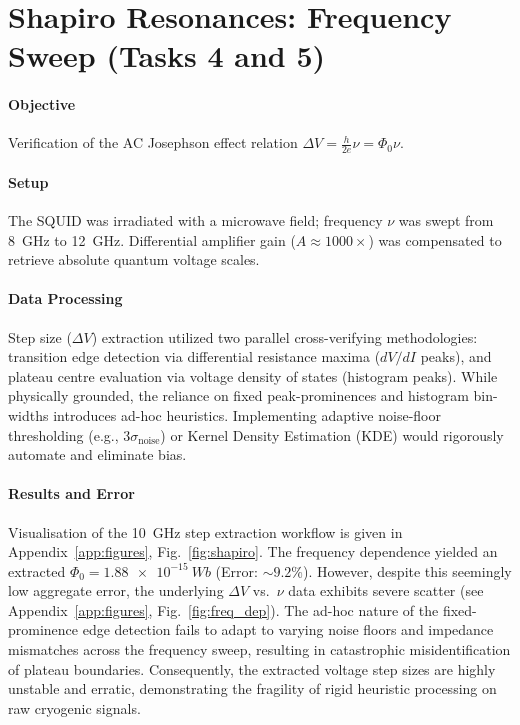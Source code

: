 \documentclass[10pt, a4paper]{article}
\begin{document}
\section{Shapiro Resonances: Frequency Sweep (Tasks 4 and 5)}
\paragraph{Objective} Verification of the AC Josephson effect relation $\Delta V = \frac{h}{2e}\nu = \Phi_0 \nu$.
\paragraph{Setup} The SQUID was irradiated with a microwave field; frequency $\nu$ was swept from \SI{8}{GHz} to \SI{12}{GHz}. Differential amplifier gain ($A \approx 1000\times$) was compensated to retrieve absolute quantum voltage scales.
\paragraph{Data Processing} Step size ($\Delta V$) extraction utilized two parallel cross-verifying methodologies: transition edge detection via differential resistance maxima ($dV/dI$ peaks), and plateau centre evaluation via voltage density of states (histogram peaks). While physically grounded, the reliance on fixed peak-prominences and histogram bin-widths introduces ad-hoc heuristics. Implementing adaptive noise-floor thresholding (e.g., $3\sigma_{\text{noise}}$) or Kernel Density Estimation (KDE) would rigorously automate and eliminate bias.
\paragraph{Results and Error} Visualisation of the \SI{10}{GHz} step extraction workflow is given in Appendix~\ref{app:figures}, Fig.~\ref{fig:shapiro}. The frequency dependence yielded an extracted $\Phi_0 = \SI{1.88e-15}{Wb}$ (Error: $\sim 9.2\%$). However, despite this seemingly low aggregate error, the underlying $\Delta V$ vs.\ $\nu$ data exhibits severe scatter (see Appendix~\ref{app:figures}, Fig.~\ref{fig:freq_dep}). The ad-hoc nature of the fixed-prominence edge detection fails to adapt to varying noise floors and impedance mismatches across the frequency sweep, resulting in catastrophic misidentification of plateau boundaries. Consequently, the extracted voltage step sizes are highly unstable and erratic, demonstrating the fragility of rigid heuristic processing on raw cryogenic signals.
\end{document}
